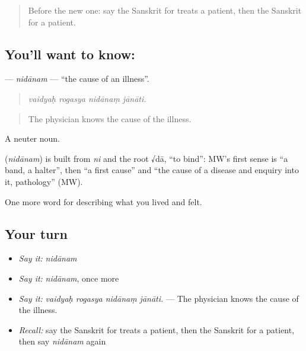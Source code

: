 \label{lesson:SA-C482-nidanam}



\begin{quote}
Before the new one: say the Sanskrit for treats a patient, then the Sanskrit for a patient.
\end{quote}

\subsection*{You'll want to know: }
\textbf{} — \emph{nidānam} — \textquotedblleft{}the cause of an illness\textquotedblright{}.

\begin{quote}
   
\end{quote}

\begin{quote}
\emph{vaidyaḥ rogasya nidānaṃ jānāti.}
\end{quote}

\begin{quote}
The physician knows the cause of the illness.
\end{quote}

A neuter noun.

\begin{cousinweb}
\textbf{} (\emph{nidānam}) is built from \emph{ni} and the root √dā, \textquotedblleft{}to bind\textquotedblright{}: MW's first sense is \textquotedblleft{}a band, a halter\textquotedblright{}, then \textquotedblleft{}a first cause\textquotedblright{} and \textquotedblleft{}the cause of a disease and enquiry into it, pathology\textquotedblright{} (MW).
\end{cousinweb}

\begin{grammarlens}[title={What you've built}]
One more word for describing what you lived and felt.
\end{grammarlens}

\subsection*{Your turn}
\begin{itemize}
\raggedright
  \item \emph{Say it:} \emph{nidānam}
  \item \emph{Say it:} \emph{nidānam}, once more
  \item \emph{Say it:} \emph{vaidyaḥ rogasya nidānaṃ jānāti.} — The physician knows the cause of the illness.
  \item \emph{Recall:} say the Sanskrit for treats a patient, then the Sanskrit for a patient, then say \emph{nidānam} again
\end{itemize}


